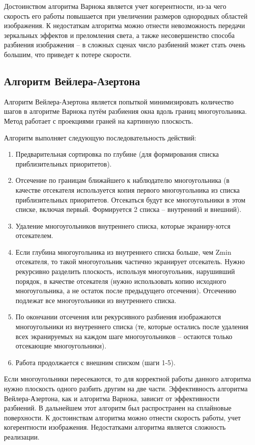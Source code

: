\documentclass[12pt,a4paper,oneside]{report}
\begin{document}
	Достоинством алгоритма Варнока является учет когерентности, из-за чего скорость его работы повышается при увеличении размеров однородных областей изображения. К недостаткам алгоритма можно отнести невозможность передачи зеркальных эффектов и преломления света, а также несовершенство способа разбиения изображения – в сложных сценах число разбиений может стать очень большим, что приведет к потере скорости.
	
	\subsection{Алгоритм Вейлера-Азертона}
	\quad Алгоритм Вейлера-Азертона является попыткой минимизировать количество шагов в алгоритме Варнока путём разбиения окна вдоль границ многоугольника. Метод работает с проекциями граней на картинную плоскость.
	
	Алгоритм выполняет следующую последовательность действий:
	\begin{enumerate}
		\item Предварительная сортировка по глубине (для формирования списка приблизительных приоритетов).
		\item Отсечение по границам ближайшего к наблюдателю многоугольника (в качестве отсекателя используется копия первого многоугольника из списка приблизительных приоритетов. Отсекаться будут все многоугольники в этом списке, включая первый. Формируется 2 списка – внутренний и внешний).
		\item Удаление многоугольников внутреннего списка, которые экраниру-ются отсекателем.
		\item Если глубина многоугольника из внутреннего списка больше, чем Zmin отсекателя, то такой многоугольник частично экранирует отсекатель. Нужно рекурсивно разделить плоскость, используя многоугольник, нарушивший порядок, в качестве отсекателя (нужно использовать копию исходного многоугольника, а не остаток после предыдущего отсечения). Отсечению подлежат все многоугольники из внутреннего списка.
		\item По окончании отсечения или рекурсивного разбиения изображаются многоугольники из внутреннего списка (те, которые остались после удаления всех экранируемых на каждом шаге многоугольников – остаются только отсекающие многоугольники).
		\item Работа продолжается с внешним списком (шаги 1-5).
	\end{enumerate}
	
	 Если многоугольники пересекаются, то для корректной работы данного алгоритма нужно плоскость одного разбить другим на две части. Эффективность алгоритма Вейлера-Азертона, как и алгоритма Варнока, зависит от эффективности разбиений. В дальнейшем этот алгоритм был распространен на сплайновые поверхности. К достоинствам алгоритма можно отнести скорость работы, учет когерентности изображения. Недостатками алгоритма является сложность реализации.
	
\end{document}
